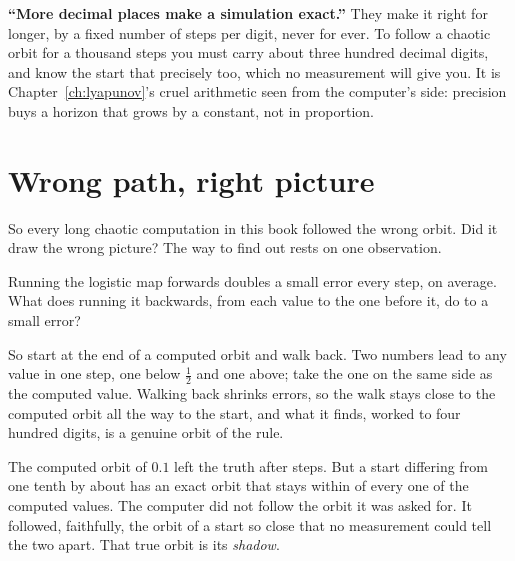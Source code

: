 \begin{trapbox}
\textbf{\enquote{More decimal places make a simulation exact.}} They make it
right for longer, by a fixed number of steps per digit, never for ever. To
follow a chaotic orbit for a thousand steps you must carry about three
hundred decimal digits, and know the start that precisely too, which no
measurement will give you. It is Chapter~\ref{ch:lyapunov}'s cruel arithmetic
seen from the computer's side: precision buys a horizon that grows by a
constant, not in proportion.
\end{trapbox}

\section{Wrong path, right picture}
\label{sec:ch16-shadow}

\noindent
So every long chaotic computation in this book followed the wrong orbit. Did
it draw the wrong picture? The way to find out rests on one observation.

\begin{think}
Running the logistic map forwards doubles a small error every step, on
average. What does running it backwards, from each value to the one before
it, do to a small error?
\end{think}
So start at the end of a computed orbit and walk back. Two numbers lead to
any value in one step, one below $\tfrac{1}{2}$ and one above; take the one on
the same side as the computed value. Walking back shrinks errors, so the walk
stays close to the computed orbit all the way to the start, and what it finds,
worked to four hundred digits, is a genuine orbit of the rule.



\noindent
The computed orbit of $\num{0.1}$ left the truth after 
steps. But a start differing from one tenth by about 
has an exact orbit that stays within  of every one of the
 computed values. The computer did not follow the
orbit it was asked for. It followed, faithfully, the orbit of a start so close
that no measurement could tell the two apart. That true orbit is its
\emph{shadow}.

